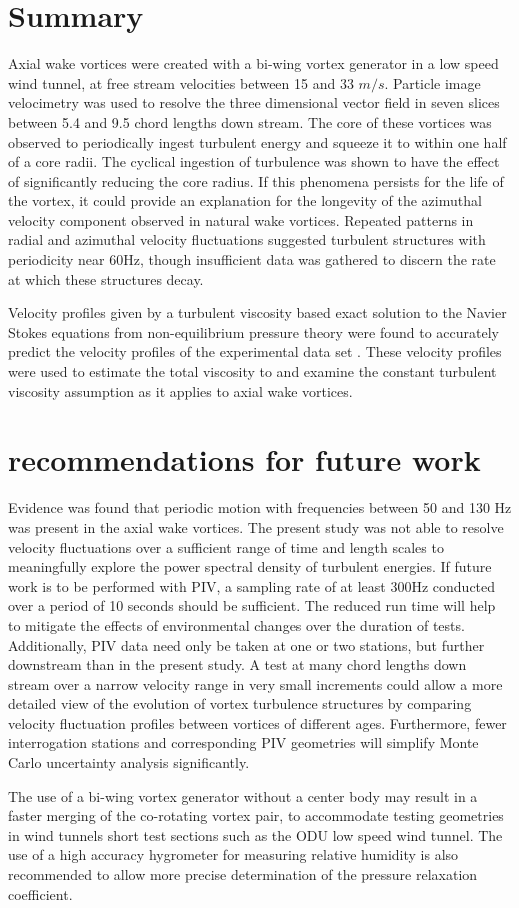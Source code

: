 
\section{Summary}

Axial wake vortices were created with a bi-wing vortex generator in a low speed 
wind tunnel, at free stream velocities between 15 and 33 $m/s$. Particle image 
velocimetry was used to resolve the three dimensional vector field in seven 
slices between 5.4 and 9.5 chord lengths down stream. The core of these 
vortices was observed to periodically ingest turbulent energy and squeeze it to 
within one half of a core radii. The cyclical ingestion of turbulence was shown 
to have the effect of significantly reducing the core radius. If this phenomena 
persists for the life of the vortex, it could provide an explanation for the 
longevity of the azimuthal velocity component observed in natural wake 
vortices. Repeated patterns in radial and azimuthal velocity fluctuations 
suggested turbulent structures with periodicity near 60Hz, though insufficient 
data was gathered to discern the rate at which these structures decay.

Velocity profiles given by a turbulent viscosity based exact solution to the 
Navier Stokes equations
from non-equilibrium pressure theory were found to accurately predict 
the velocity profiles of the experimental data set \cite{ash2011}. These 
velocity profiles were used to estimate the total viscosity to and examine the 
constant turbulent viscosity assumption as it applies to axial wake vortices. 

\newpage
\section{recommendations for future work}
Evidence was found that periodic motion with frequencies between 50 and 130 Hz 
was present in the axial wake vortices. The present study was not able to 
resolve velocity fluctuations over a sufficient range of time and length scales 
to meaningfully explore the power spectral density of turbulent energies. If 
future work is to be performed with PIV, a sampling rate of at least 300Hz 
conducted over a period of 10 seconds should be sufficient. The reduced run 
time will help to mitigate the effects of environmental changes over the 
duration of tests. Additionally, PIV 
data need only be taken at one or two stations, but further downstream than in 
the present study. A test at many chord lengths down stream over a narrow 
velocity range in very small increments could allow a 
more detailed view of the evolution of vortex turbulence structures by 
comparing velocity fluctuation profiles between vortices of different ages. 
Furthermore, fewer interrogation stations and corresponding PIV geometries will 
simplify Monte Carlo uncertainty analysis significantly. 

The use of a 
bi-wing vortex generator without a center body may result in a faster merging 
of the co-rotating vortex pair, to accommodate testing geometries in wind 
tunnels short test sections such as the ODU low speed wind tunnel. The use of a 
high accuracy hygrometer for measuring relative humidity is also recommended to 
allow more precise determination of the pressure relaxation coefficient.
